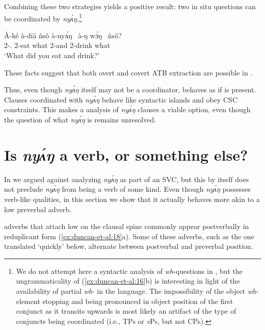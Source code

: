 \documentclass[output=paper,modfonts,nonflat,
hidelinks
]{langsci/langscibook}
\begin{document}
\noindent Combining these two strategies yields a positive result: two {in situ} questions can be coordinated by \textit{ny\'{ʌ}ŋ}.\footnote{We do not attempt here a syntactic analysis of \textit{wh}-questions in , but the ungrammaticality of (\ref{ex:duncan-et-al:16}b) is interesting in light of the availability of partial \textit{wh}- in the language. The impossibility of the object \textit{wh}-element stopping and being pronounced in object position of the first conjunct as it transits upwards is most likely an artifact of the type of conjuncts being coordinated (i.e., TPs or \textit{v}Ps, but not CPs).}

\ea\label{ex:19:covert-ATB-two-obj}
\gll \`{A}-ké à-díá ǹs\v{o} à-ny\'{ʌ}ŋ~ à-ŋ w\'ɔŋ~ ǹs\v{o}? \\
2{\SG-\PST.\FOC} 2{\SG}-eat what 2{\SG}-and 2{\SG}-drink what \\
\glt `What did you eat and drink?'
\z

\noindent These facts suggest that both overt and covert ATB extraction are possible in . 

Thus, even though \textit{ny\'{ʌ}ŋ} itself may not be a coordinator,  behaves as if  is present. Clauses coordinated with \textit{ny\'{ʌ}ŋ} behave like syntactic islands and obey CSC constraints. This makes a  analysis of \textit{ny\'{ʌ}ŋ} clauses a viable option, even though the question of what \textit{ny\'{ʌ}ŋ} is remains unresolved.

\section{Is \textit{ny\'{ʌ}ŋ} a verb, or something else?}\label{sec:duncan-et-al:5}

In  we argued against analyzing \textit{ny\'{ʌ}ŋ} as part of an SVC, but this by itself does not preclude \textit{ny\'{ʌ}ŋ} from being a verb of some kind. Even though \textit{ny\'{ʌ}ŋ} possesses verb-like qualities, in this section we show that it actually behaves more akin to a low preverbal adverb.

 adverbs that attach low on the clausal spine commonly appear postverbally in reduplicant form (\ref{ex:duncan-et-al:18}a). Some of these adverbs, such as the one translated `quickly' below, alternate between postverbal and preverbal position.
\end{document}
